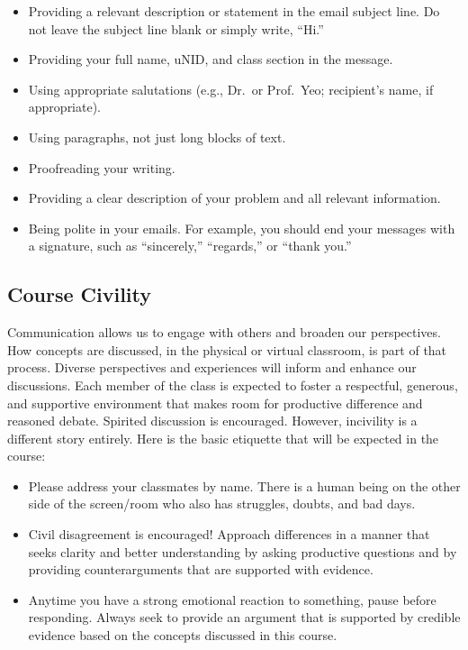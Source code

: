 \documentclass[
  letterpaper,
]{article}
\providecommand{\tightlist}{%
  \setlength{\itemsep}{0pt}\setlength{\parskip}{0pt}}\usepackage{longtable,booktabs,array}
\begin{document}
\begin{itemize}
\tightlist
\item
  Providing a relevant description or statement in the email subject
  line. Do not leave the subject line blank or simply write, ``Hi.''
\item
  Providing your full name, uNID, and class section in the message.
\item
  Using appropriate salutations (e.g., Dr.~or Prof.~Yeo; recipient's
  name, if appropriate).
\item
  Using paragraphs, not just long blocks of text.
\item
  Proofreading your writing.
\item
  Providing a clear description of your problem and all relevant
  information.
\item
  Being polite in your emails. For example, you should end your messages
  with a signature, such as ``sincerely,'' ``regards,'' or ``thank
  you.''
\end{itemize}

\subsection{Course Civility}\label{course-civility}

Communication allows us to engage with others and broaden our
perspectives. How concepts are discussed, in the physical or virtual
classroom, is part of that process. Diverse perspectives and experiences
will inform and enhance our discussions. Each member of the class is
expected to foster a respectful, generous, and supportive environment
that makes room for productive difference and reasoned debate. Spirited
discussion is encouraged. However, incivility is a different story
entirely. Here is the basic etiquette that will be expected in the
course:

\begin{itemize}
\tightlist
\item
  Please address your classmates by name. There is a human being on the
  other side of the screen/room who also has struggles, doubts, and bad
  days.
\item
  Civil disagreement is encouraged! Approach differences in a manner
  that seeks clarity and better understanding by asking productive
  questions and by providing counterarguments that are supported with
  evidence.
\item
  Anytime you have a strong emotional reaction to something, pause
  before responding. Always seek to provide an argument that is
  supported by credible evidence based on the concepts discussed in this
  course.
\end{itemize}
\end{document}
